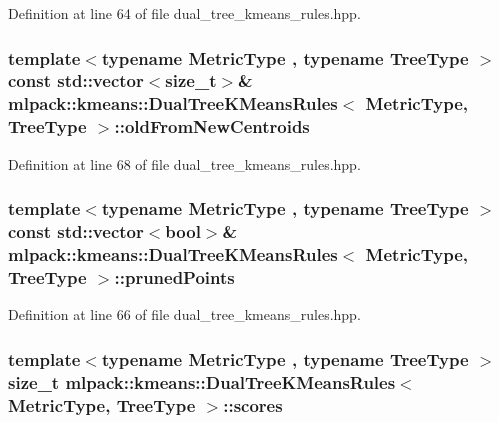 Definition at line 64 of file dual\+\_\+tree\+\_\+kmeans\+\_\+rules.\+hpp.

\subsubsection[{old\+From\+New\+Centroids}]{\setlength{\rightskip}{0pt plus 5cm}template$<$typename Metric\+Type , typename Tree\+Type $>$ const std\+::vector$<$size\+\_\+t$>$\& {\bf mlpack\+::kmeans\+::\+Dual\+Tree\+K\+Means\+Rules}$<$ Metric\+Type, Tree\+Type $>$\+::old\+From\+New\+Centroids\hspace{0.3cm}{\ttfamily [private]}}\label{classmlpack_1_1kmeans_1_1DualTreeKMeansRules_a2839b6071dcf57838224d682cf28baa4}


Definition at line 68 of file dual\+\_\+tree\+\_\+kmeans\+\_\+rules.\+hpp.

\subsubsection[{pruned\+Points}]{\setlength{\rightskip}{0pt plus 5cm}template$<$typename Metric\+Type , typename Tree\+Type $>$ const std\+::vector$<$bool$>$\& {\bf mlpack\+::kmeans\+::\+Dual\+Tree\+K\+Means\+Rules}$<$ Metric\+Type, Tree\+Type $>$\+::pruned\+Points\hspace{0.3cm}{\ttfamily [private]}}\label{classmlpack_1_1kmeans_1_1DualTreeKMeansRules_a8f8a5c72f04d3a9effc30b007351ee19}


Definition at line 66 of file dual\+\_\+tree\+\_\+kmeans\+\_\+rules.\+hpp.

\subsubsection[{scores}]{\setlength{\rightskip}{0pt plus 5cm}template$<$typename Metric\+Type , typename Tree\+Type $>$ size\+\_\+t {\bf mlpack\+::kmeans\+::\+Dual\+Tree\+K\+Means\+Rules}$<$ Metric\+Type, Tree\+Type $>$\+::scores\hspace{0.3cm}{\ttfamily [private]}}\label{classmlpack_1_1kmeans_1_1DualTreeKMeansRules_a68ea05e30c82b6c2e0bfbdc98fe40e9c}


